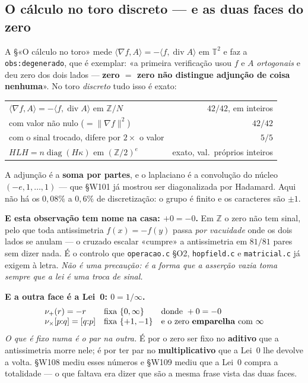 \documentclass[11pt,a4paper]{article}
\newcommand{\code}[1]{\texttt{\small #1}}
\newcommand{\Z}{\ensuremath{\mathbb{Z}}}
\begin{document}
\subsection*{O cálculo no toro discreto --- e as duas faces do zero}

\noindent A §«O cálculo no toro» mede $\langle\nabla f,A\rangle=-\langle f,\operatorname{div}A\rangle$
em $\mathbb T^2$ e faz a \code{obs:degenerado}, que é exemplar: «a primeira verificação
usou $f$ e $A$ \emph{ortogonais} e deu zero dos dois lados --- \textbf{zero $=$ zero
não distingue adjunção de coisa nenhuma}». No toro \emph{discreto} tudo isso é exato:
\begin{center}
\begin{tabular}{@{}lr@{}}
\toprule
$\langle\nabla f,A\rangle=-\langle f,\operatorname{div}A\rangle$ em $\Z/N$ & $42/42$, em inteiros\\
com valor não nulo ($=\lVert\nabla f\rVert^{2}$) & $42/42$\\
com o sinal trocado, difere por $2\times$ o valor & $5/5$\\
$HLH=n\operatorname{diag}(H\kappa)$ em $(\Z/2)^{e}$ & exato, val.\ próprios inteiros\\
\bottomrule
\end{tabular}
\end{center}
\noindent A adjunção é a \textbf{soma por partes}, e o laplaciano é a convolução do
núcleo $(-e,1,\dots,1)$ --- que §W101 já mostrou ser diagonalizada por Hadamard. Aqui
não há os $0{,}08\%$ a $0{,}6\%$ de discretização: o grupo é finito e os caracteres
são $\pm1$.

\medskip\noindent\textbf{E esta observação tem nome na casa: $+0=-0$.} Em $\Z$ o zero
não tem sinal, pelo que toda antissimetria $f(x)=-f(y)$ passa \emph{por vacuidade}
onde os dois lados se anulam --- o cruzado escalar «cumpre» a antissimetria em $81/81$
pares sem dizer nada. É o controlo que \code{operacao.c} §O2, \code{hopfield.c} e
\code{matricial.c} já exigem à letra. \emph{Não é uma precaução: é a forma que a
asserção vazia toma sempre que a lei é uma troca de sinal.}

\medskip\noindent\textbf{E a outra face é a Lei~0: $0=1/\infty$.}
\[
\begin{array}{lll}
\nu_+(r)=-r & \text{fixa } \{0,\infty\} & \text{donde } +0=-0\\
\nu_\times[p{:}q]=[q{:}p] & \text{fixa } \{+1,-1\} & \text{e o zero \textbf{emparelha} com } \infty
\end{array}
\]
\emph{O que é fixo numa é o par na outra.} É por o zero ser fixo no \textbf{aditivo}
que a antissimetria morre nele; é por ter par no \textbf{multiplicativo} que a Lei~0
lhe devolve a volta. §W108 mediu esses números e §W109 mediu que a Lei~0 compra a
totalidade --- o que faltava era dizer que são a mesma frase vista das duas faces.
\end{document}
